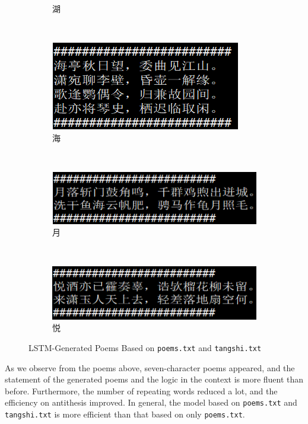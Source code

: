 \documentclass[10pt]{article}
\begin{document}
\begin{figure}[H]
\begin{subfigure}[t]{0.24\textwidth}
\caption{湖}
\label{tangshi_5}
\end{subfigure}%
~
\begin{subfigure}[t]{0.23\textwidth}
\centering
\includegraphics[scale=.6]{tangshi_6.png}
\caption{海}
\label{tangshi_6}
\end{subfigure}
~
\begin{subfigure}[t]{0.23\textwidth}
\centering
\includegraphics[scale=.6]{tangshi_7.png}
\caption{月}
\label{tangshi_7}
\end{subfigure}
~
\begin{subfigure}[t]{0.23\textwidth}
\centering
\includegraphics[scale=.6]{tangshi_8.png}
\caption{悦}
\label{tangshi_8}
\end{subfigure}
\caption{LSTM-Generated Poems Based on \texttt{poems.txt} and \texttt{tangshi.txt}}
\end{figure}
As we observe from the poems above, seven-character poems appeared, and the statement of the generated poems and the logic in the context is more fluent than before. Furthermore, the number of repeating words reduced a lot, and the efficiency on antithesis improved. In general, the model based on \texttt{poems.txt} and \texttt{tangshi.txt} is more efficient than that based on only \texttt{poems.txt}.
\end{document}
